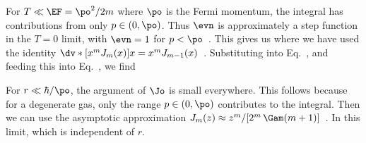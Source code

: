 {	For $T \ll \EF = \po^2 / 2m$ where $\po$ is the Fermi momentum, the integral has contributions from only $p \in (0, \po)$.  Thus $\evn$ is approximately a step function in the $T = 0$ limit, with $\evn = 1$ for $p < \po$~\cite[p.~357]{Landau}.  This gives us
	where we have used the identity $\dv*{[ x^m J_m(x) ]}{x} = x^m J_{m-1}(x)$~\cite{BesselJ}.  Substituting into Eq.~,
	and feeding this into Eq.~, we find
	
	For $r \ll \hbar / \po$, the argument of $\Jo$ is small everywhere.  This follows because for a degenerate gas, only the range $p \in (0, \po)$ contributes to the integral.  Then we can use the asymptotic approximation $J_m(z) \approx z^m / [ 2^m \,\Gam(m + 1) ]$~\cite{BesselJ}.  In this limit,
	which is independent of $r$.
	
}
